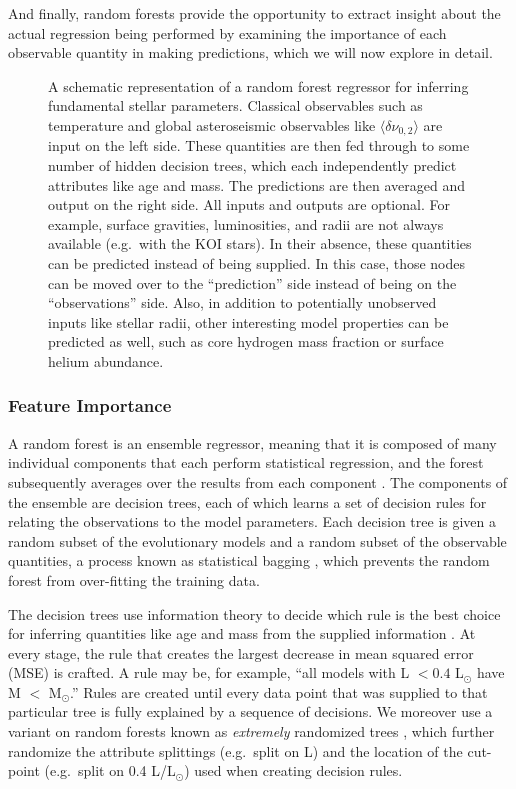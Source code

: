 \documentclass[twocolumn,twocolappendix]{aastex6}
\begin{document}
And finally, random forests provide the opportunity to extract insight about the actual regression being performed by examining the importance of each observable quantity in making predictions, which we will now explore in detail. 

\begin{figure*}[ht]
    \centering
    
    \caption{A schematic representation of a random forest regressor for inferring fundamental stellar parameters. Classical observables such as temperature and global asteroseismic observables like $\langle\delta\nu_{0,2}\rangle$ are input on the left side. These quantities are then fed through to some number of hidden decision trees, which each independently predict attributes like age and mass. The predictions are then averaged and output on the right side. All inputs and outputs are optional. For example, surface gravities, luminosities, and radii are not always available (e.g.\ with the KOI stars). In their absence, these quantities can be predicted instead of being supplied. In this case, those nodes can be moved over to the ``prediction'' side instead of being on the ``observations'' side. Also, in addition to potentially unobserved inputs like stellar radii, other interesting model properties can be predicted as well, such as core hydrogen mass fraction or surface helium abundance. \label{fig:rf} }
\end{figure*}


\pagebreak
\subsubsection{Feature Importance} \label{sec:importances}
A random forest is an ensemble regressor, meaning that it is composed of many individual components that each perform statistical regression, and the forest subsequently averages over the results from each component \citep{breiman2001random}. The components of the ensemble are decision trees, each of which learns a set of decision rules for relating the observations to the model parameters. Each decision tree is given a random subset of the evolutionary models and a random subset of the observable quantities, a process known as statistical bagging \citep[][Section 8.7]{hastie2005elements}, which prevents the random forest from over-fitting the training data. 

The decision trees use information theory to decide which rule is the best choice for inferring quantities like age and mass from the supplied information \citep[][Chapter 9]{hastie2005elements}. At every stage, the rule that creates the largest decrease in mean squared error (MSE) is crafted. A rule may be, for example, ``all models with L $<0.4$ L$_\odot$ have M $<$ M$_\odot$.'' Rules are created until every data point that was supplied to that particular tree is fully explained by a sequence of decisions. We moreover use a variant on random forests known as \emph{extremely} randomized trees \citep{geurts2006extremely}, which further randomize the attribute splittings (e.g.\ split on L) and the location of the cut-point (e.g.\ split on 0.4 L/L$_\odot$) used when creating decision rules. 
\end{document}

